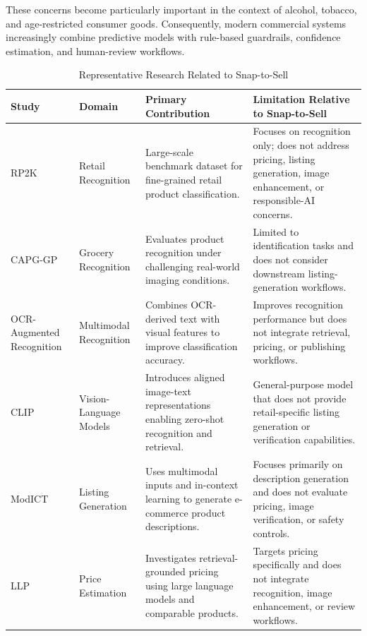 \documentclass[conference]{IEEEtran}
\begin{document}
These concerns become particularly important in the context of alcohol,
tobacco, and age-restricted consumer goods. Consequently, modern
commercial systems increasingly combine predictive models with rule-based
guardrails, confidence estimation, and human-review workflows.
\begin{table}[t]
\centering
\caption{Representative Research Related to Snap-to-Sell}
\label{tab:related_work}
\renewcommand{\arraystretch}{1.15}
\setlength{\tabcolsep}{5pt}
\scriptsize
\begin{tabular}{p{2.3cm} p{1.8cm} p{4.0cm} p{5.0cm}}
\hline
\textbf{Study} &
\textbf{Domain} &
\textbf{Primary Contribution} &
\textbf{Limitation Relative to Snap-to-Sell} \\
\hline

RP2K \cite{peng2020rp2k}
&
Retail Recognition
&
Large-scale benchmark dataset for fine-grained retail product classification.
&
Focuses on recognition only; does not address pricing, listing generation, image enhancement, or responsible-AI concerns.
\\

CAPG-GP \cite{geng2018capg}
&
Grocery Recognition
&
Evaluates product recognition under challenging real-world imaging conditions.
&
Limited to identification tasks and does not consider downstream listing-generation workflows.
\\

OCR-Augmented Recognition \cite{ocrfusion2023}
&
Multimodal Recognition
&
Combines OCR-derived text with visual features to improve classification accuracy.
&
Improves recognition performance but does not integrate retrieval, pricing, or publishing workflows.
\\

CLIP \cite{radford2021clip}
&
Vision-Language Models
&
Introduces aligned image-text representations enabling zero-shot recognition and retrieval.
&
General-purpose model that does not provide retail-specific listing generation or verification capabilities.
\\

ModICT \cite{li2024modict}
&
Listing Generation
&
Uses multimodal inputs and in-context learning to generate e-commerce product descriptions.
&
Focuses primarily on description generation and does not evaluate pricing, image verification, or safety controls.
\\

LLP \cite{llp2025}
&
Price Estimation
&
Investigates retrieval-grounded pricing using large language models and comparable products.
&
Targets pricing specifically and does not integrate recognition, image enhancement, or review workflows.
\\


\end{tabular}
\end{table}
\end{document}
